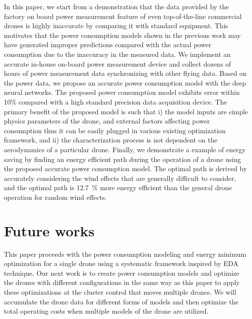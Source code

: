 \documentclass[journal]{./template/IEEEtran}
\begin{document}
In this paper, we start from a demonstration that the data provided by the factory on board power measurement feature of even top-of-the-line commercial drones is highly inaccurate by comparing it with standard equipment. 
This motivates that the power consumption models shown in the previous work may have generated improper predictions compared with the actual power consumption due to the inaccuracy in the measured data.
We implement an accurate in-house on-board power measurement device and collect dozens of hours of power measurement data synchronizing with other flying data. 
Based on the power data, we propose an accurate power consumption model with the deep neural networks. 
The proposed power consumption model exhibits error within 10\% compared with a high standard precision data acquisition device. 
The primary benefit of the proposed model is such that i) the model inputs are simple physics parameters of the drone, and external factors affecting power consumption thus it can be easily plugged in various existing optimization framework, and ii) the characterization process is not dependent on the aerodynamics of a particular drone. %
Finally, we demonstrate a example of energy saving by finding an energy efficient path during the operation of a drone using the proposed accurate power consumption model. The optimal path is derived by accurately considering the wind effects that are generally difficult to consider, and the optimal path is 12.7~\% more energy efficient than the general drone operation for random wind effects.






\section{Future works}
This paper proceeds with the power consumption modeling and energy minimum optimization for a single drone using a systematic framework inspired by EDA technique. Our next work is to create power consumption models and optimize the drones with different configurations in the same way as this paper to apply these optimizations at the cluster control that moves multiple drones. We will accumulate the drone data for different forms of models and then optimize the total operating costs when multiple models of the drone are utilized.
\end{document}
